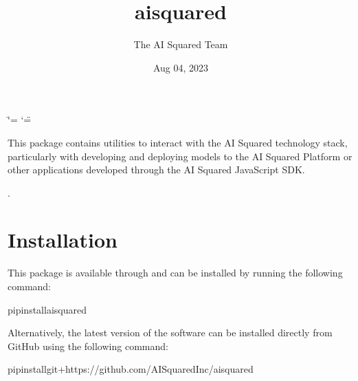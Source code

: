 \documentclass[letterpaper,10pt,english]{sphinxmanual}
\title{aisquared}
\date{Aug 04, 2023}
\author{The AI Squared Team}
\let\sphinxpxdimen\pdfpxdimen\else\newdimen\sphinxpxdimen
\begin{document}
\ifdefined\shorthandoff
  \ifnum\catcode`\=\string=\active\shorthandoff{=}\fi
  \ifnum\catcode`\"=\active{}\fi
\fi

\pagestyle{empty}
\sphinxmaketitle
\pagestyle{plain}
\sphinxtableofcontents
\pagestyle{normal}
\label{\detokenize{index::doc}}
\noindent{\hspace*{\fill}\sphinxincludegraphics[width=400\sphinxpxdimen]{{aisquared}.png}\hspace*{\fill}}

\begin{DUlineblock}{0em}
\item[] 
\item[] 
\end{DUlineblock}



\sphinxAtStartPar
This package contains utilities to interact with the AI Squared technology stack, particularly with developing and deploying models to the AI Squared Platform or other applications developed through the AI Squared JavaScript SDK.

\sphinxAtStartPar
{} 

\sphinxAtStartPar
{}.

\begin{DUlineblock}{0em}
\item[] 
\end{DUlineblock}


\chapter{Installation}
\label{\detokenize{index:installation}}
\sphinxAtStartPar
This package is available through  and can be installed by running the following command:

\begin{sphinxVerbatim}[commandchars=\\\{\}]
pipinstallaisquared
\end{sphinxVerbatim}

\sphinxAtStartPar
Alternatively, the latest version of the software can be installed directly from GitHub using the following command:

\begin{sphinxVerbatim}[commandchars=\\\{\}]
pipinstallgit+https://github.com/AISquaredInc/aisquared
\end{sphinxVerbatim}
\end{document}
